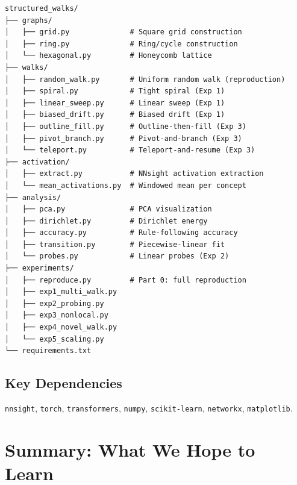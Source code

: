 \documentclass[11pt]{article}
\begin{document}
\begin{verbatim}
structured_walks/
├── graphs/
│   ├── grid.py              # Square grid construction
│   ├── ring.py              # Ring/cycle construction
│   └── hexagonal.py         # Honeycomb lattice
├── walks/
│   ├── random_walk.py       # Uniform random walk (reproduction)
│   ├── spiral.py            # Tight spiral (Exp 1)
│   ├── linear_sweep.py      # Linear sweep (Exp 1)
│   ├── biased_drift.py      # Biased drift (Exp 1)
│   ├── outline_fill.py      # Outline-then-fill (Exp 3)
│   ├── pivot_branch.py      # Pivot-and-branch (Exp 3)
│   └── teleport.py          # Teleport-and-resume (Exp 3)
├── activation/
│   ├── extract.py           # NNsight activation extraction
│   └── mean_activations.py  # Windowed mean per concept
├── analysis/
│   ├── pca.py               # PCA visualization
│   ├── dirichlet.py         # Dirichlet energy
│   ├── accuracy.py          # Rule-following accuracy
│   ├── transition.py        # Piecewise-linear fit
│   └── probes.py            # Linear probes (Exp 2)
├── experiments/
│   ├── reproduce.py         # Part 0: full reproduction
│   ├── exp1_multi_walk.py
│   ├── exp2_probing.py
│   ├── exp3_nonlocal.py
│   ├── exp4_novel_walk.py
│   └── exp5_scaling.py
└── requirements.txt
\end{verbatim}

\subsection{Key Dependencies}

\texttt{nnsight}, \texttt{torch}, \texttt{transformers}, \texttt{numpy}, \texttt{scikit-learn}, \texttt{networkx}, \texttt{matplotlib}.

\section{Summary: What We Hope to Learn}
\label{sec:summary}
\end{document}
